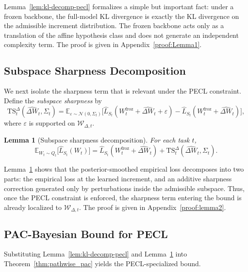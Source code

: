 \documentclass[10pt]{article} %
\newtheorem{lemma}{Lemma}
\begin{document}
Lemma~\ref{lem:kl-decomp-pecl} formalizes a simple but important fact:
under a frozen backbone, the full-model KL divergence is exactly the KL divergence on the admissible increment distribution.
The frozen backbone acts only as a translation of the affine hypothesis class and does not generate an independent complexity term.
The proof is given in Appendix~\ref{proof:Lemma1}.

\subsection{Subspace Sharpness Decomposition}
\label{sec:sharpness-decomp}

We next isolate the sharpness term that is relevant under the PECL constraint.
Define the \emph{subspace sharpness} by
\[
\mathrm{TS}_t^\Delta(\widehat{\Delta W}_t,\Sigma_t)
=
\mathbb{E}_{\varepsilon \sim \mathcal{N}(0,\Sigma_t)}
\Big[
\hat L_{S_t}(W_t^{\mathrm{froz}}+\widehat{\Delta W}_t+\varepsilon)
-
\hat L_{S_t}(W_t^{\mathrm{froz}}+\widehat{\Delta W}_t)
\Big],
\]
where $\varepsilon$ is supported on $\mathcal{W}_{\Delta,t}$.

\begin{lemma}[Subspace sharpness decomposition]
\label{lem:subspace-loss-pecl}
For each task $t$,
\[
\mathbb{E}_{W_t \sim Q_t}\big[\hat L_{S_t}(W_t)\big]
=
\hat L_{S_t}(W_t^{\mathrm{froz}}+\widehat{\Delta W}_t)
+
\mathrm{TS}_t^\Delta(\widehat{\Delta W}_t,\Sigma_t).
\]
\end{lemma}

Lemma~\ref{lem:subspace-loss-pecl} shows that the posterior-smoothed empirical loss decomposes into two parts:
the empirical loss at the learned increment, and an additive sharpness correction generated only by perturbations inside the admissible subspace.
Thus, once the PECL constraint is enforced, the sharpness term entering the bound is already localized to $\mathcal{W}_{\Delta,t}$.
The proof is given in Appendix~\ref{proof:lemma2}.

\subsection{PAC-Bayesian Bound for PECL}
\label{sec:pecl-bound}

Substituting Lemma~\ref{lem:kl-decomp-pecl} and Lemma~\ref{lem:subspace-loss-pecl} into Theorem~\ref{thm:pathwise_pac} yields the PECL-specialized bound.
\end{document}
